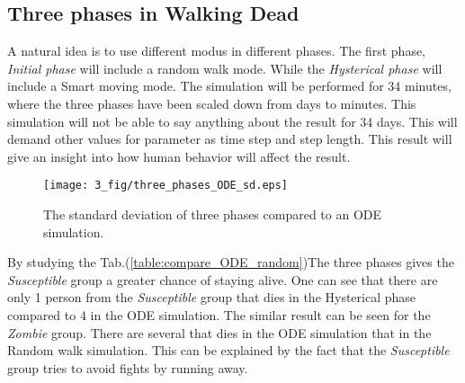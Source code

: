 \documentclass[%
twoside,                 %
final,                   %
chapterprefix=true,      %
open=right               %
10pt]{book}
\begin{document}
\noindent


\subsection{Three phases in Walking Dead}
A natural idea is to use different modus in different phases. The first phase, \emph{Initial phase} will include a random walk mode. While the \emph{Hysterical phase} will include a Smart moving mode. The simulation will be performed for 34 minutes, where the three phases have been scaled down from days to minutes. This simulation will not be able to say anything about the result for 34 days. This will demand other values for parameter as time step and step length. This result will give an insight into how human behavior will affect the result.  


\begin{figure}[ht]
  \centerline{\texttt{[image: 3\_fig/three\_phases\_ODE\_sd.eps]}}
  \caption{
  The standard deviation of three phases compared to an ODE simulation.
  }
\end{figure}


By studying the Tab.(\ref{table:compare_ODE_random})The three phases gives the \emph{Susceptible} group a greater chance of staying alive. One can see that there are only 1 person from the \emph{Susceptible} group that dies in the Hysterical phase compared to 4 in the ODE simulation. The similar result can be seen for the \emph{Zombie} group. There are several that dies in the ODE simulation that in the Random walk simulation. This can be explained by the fact that the \emph{Susceptible} group tries to avoid fights by running away. 

\label{table:compare_ODE_random}
\end{document}
